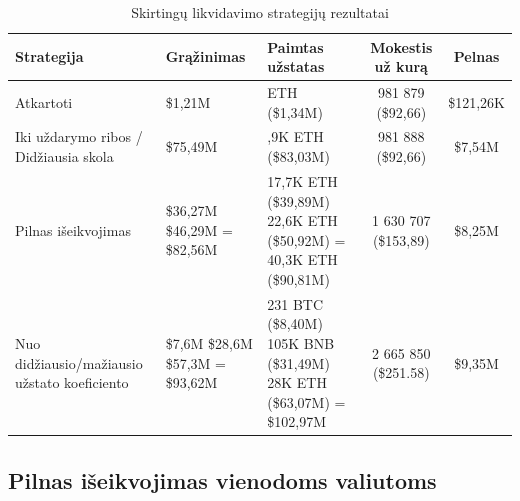 \documentclass[]{VUMIFTemplateClass}
\begin{document}
\begin{table}[h!]
  \centering
  \caption{Skirtingų likvidavimo strategijų rezultatai}
  \begin{tabular}{|>{\raggedright\arraybackslash}m{3.5cm}|>{\centering\arraybackslash}p{2cm}|>{\centering\arraybackslash}p{4cm}|c|c|}
  \hline
  \textbf{Strategija} & \textbf{Grąžinimas} & \textbf{Paimtas užstatas} & \textbf{Mokestis už kurą} & \textbf{Pelnas} \\ \hline
  Atkartoti                                    & \$1,21M   & 594 ETH (\$1,34M)     & 981 879 (\$92,66)    & \$121,26K \\ \hline
  Iki uždarymo ribos / Didžiausia skola        & \$75,49M & 36,9K ETH (\$83,03M) & 981 888 (\$92,66)    & \$7,54M   \\ \hline
  Pilnas išeikvojimas                & \makecell[c]{\$36,27M \\ \$46,29M \\ = \$82,56M}  & \makecell[c]{17,7K ETH (\$39,89M) \\ 22,6K ETH (\$50,92M) \\ = 40,3K ETH (\$90,81M)}  & 1 630 707 (\$153,89) & \$8,25M   \\ \hline
  Nuo didžiausio/mažiausio užstato koeficiento & \makecell[c]{\$7,6M \\ \$28,6M \\ \$57,3M \\ = \$93,62M}  &  \makecell[c]{231 BTC (\$8,40M) \\ 105K BNB (\$31,49M) \\ 28K ETH (\$63,07M) \\ = \$102,97M}    & 2 665 850 (\$251.58)   & \$9,35M   \\ \hline
  \end{tabular}
  \label{liquidation_example_comp}
  \end{table}

\subsection{Pilnas išeikvojimas vienodoms valiutoms}
\label{sec:pilnas_iseikvojimas_vienodoms_valiutoms_tyrimas}
\end{document}
